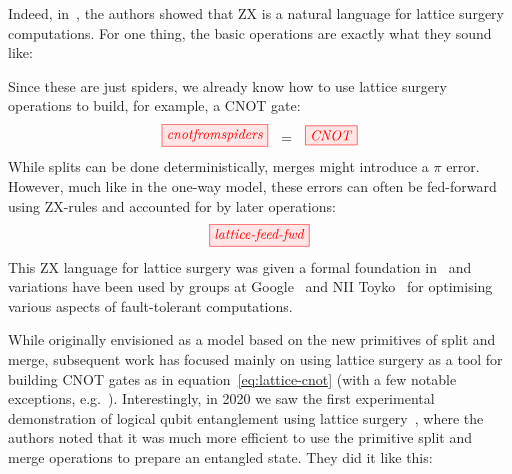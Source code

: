 \documentclass[11pt]{article}
\theoremstyle{definition}
\begin{document}
{Indeed, in~\cite{latticeZX}, the authors showed that ZX is a natural language for lattice surgery computations. For one thing, the basic operations are exactly what they sound like:

Since these are just spiders, we already know how to use lattice surgery operations to build, for example, a CNOT gate:
\begin{equation}\label{eq:lattice-cnot}
\tikzfig{cnotfromspiders} \ \ =\ \ \tikzfig{CNOT}
\end{equation}
While splits can be done deterministically, merges might introduce a $\pi$ error. However, much like in the one-way model, these errors can often be fed-forward using ZX-rules and accounted for by later operations:
\[ \tikzfig{lattice-feed-fwd} \]
This ZX language for lattice surgery was given a formal foundation in~\cite{PauliFusion} and variations have been used by groups at Google~\cite{Gidney2019} and NII Toyko~\cite{NemotoZXbraids} for optimising various aspects of fault-tolerant computations.

While originally envisioned as a model based on the new primitives of split and merge, subsequent work has focused mainly on using lattice surgery as a tool for building CNOT gates as in equation~\eqref{eq:lattice-cnot} (with a few notable exceptions, e.g.~\cite{Litinski2019gameofsurfacecodes}). Interestingly, in 2020 we saw the first experimental demonstration of logical qubit entanglement using lattice surgery~\cite[\textit{Nature}]{LatticeSurgeryNature}, where the authors noted that it was much more efficient to use the primitive split and merge operations to prepare an entangled state. They did it like this:



}
\end{document}
